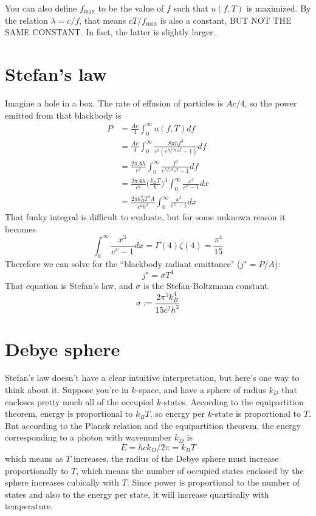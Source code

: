 \documentclass[12pt]{article}
\begin{document}
You can also define $f_\text{max}$ to be the value of $f$ such that $u(f, T)$ is maximized. By the relation $\lambda = c / f$, that means $c T / f_\text{max}$ is also a constant, BUT NOT THE SAME CONSTANT. In fact, the latter is slightly larger.

\section{Stefan's law}
Imagine a hole in a box. The rate of effusion of particles is $A c / 4$, so the power emitted from that blackbody is
\begin{align*}
    P &= \frac{A c}{4} \int_0^\infty u(f, T) df \\
      &= \frac{A c}{4} \int_0^\infty \frac{8 \pi h f^3}{c^3 (e^{hf/k_B T} - 1)}  df \\
      &= \frac{2 \pi A h}{c^2} \int_0^\infty \frac{f^3}{e^{hf/k_B T} - 1} df \\
      &= \frac{2 \pi A h}{c^2} \Bigg( \frac{k_B T}{h} \Bigg)^4 \int_0^\infty \frac{x^3}{e^x - 1} dx \\
      &= \frac{2 \pi k_B^4 T^4 A}{c^2 h^3} \int_0^\infty \frac{x^3}{e^x - 1} dx
\end{align*}
That funky integral is difficult to evaluate, but for some unknown reason it becomes
\[ \int_0^\infty \frac{x^3}{e^x - 1} dx = \Gamma(4) \zeta(4) = \frac{\pi^4}{15} \]
Therefore we can solve for the ``blackbody radiant emittance" ($j^\star = P / A$):
\[ j^\star = \sigma T^4 \]
That equation is Stefan's law, and $\sigma$ is the Stefan-Boltzmann constant.
\[ \sigma := \frac{2 \pi^5 k_B^4}{15 c^2 h^3} \]

\section{Debye sphere}
Stefan's law doesn't have a clear intuitive interpretation, but here's one way to think about it. Suppose you're in $k$-space, and have a sphere of radius $k_D$ that encloses pretty much all of the occupied $k$-states. According to the equipartition theorem, energy is proportional to $k_B T$, so energy per $k$-state is proportional to $T$. But according to the Planck relation and the equipartition theorem, the energy corresponding to a photon with wavenumber $k_D$ is
\[ E = h c k_D / 2 \pi = k_B T \]
which means as $T$ increases, the radius of the Debye sphere must increase proportionally to $T$, which means the number of occupied states enclosed by the sphere increases cubically with $T$. Since power is proportional to the number of states and also to the energy per state, it will increase quartically with temperature.
\end{document}
